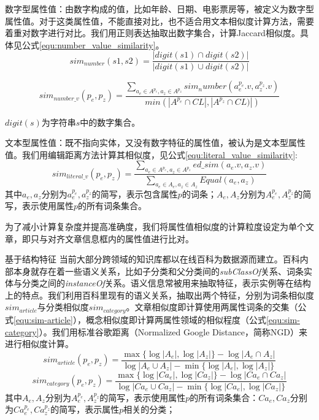 数字型属性值：由数字构成的值，比如年龄、日期、电影票房等，被定义为数字型属性值。对于这类属性值，不能直接对比，也不适合用文本相似度计算方法，需要着重对数字进行对比。我们用正则表达抽取出数字集合，计算Jaccard相似度。具体见公式\ref{equ:number_value_similarity}。
\begin{equation}
sim_{number}(s1, s2) = \frac { |digit(s1) \cap digit(s2)| }{ |digit(s1) \cup digit(s2)| }
\end{equation}

\begin{equation}
\label{equ:number_value_similarity}
sim_{number\_v}(p_e, p_z) = \frac{\sum_{a_e\in A^{p_e}, a_z \in A^{p_z}} sim_number(a_e^{p_e}.v, a_z^{p_z}.v)}{min(\left| A^{p_e}\cap CL \right|, \left|A^{p_z} \cap CL) \right|)}
\end{equation}

$digit(s)$为字符串$s$中的数字集合。

文本型属性值：既不指向实体，又没有数字特征的属性值，被认为是文本型属性值。我们用编辑距离方法计算其相似度，见公式\ref{equ:literal_value_similarity}:
\begin{equation}
\label{equ:literal_value_similarity}
sim_{literal\_v}(p_e, p_z) = \frac { \sum _{ { a }_{ e }\in { A }^{p_e },{ a }_{ z }\in { A }^{p_z } }{ ed\_sim\left( { a }_{ e }.v,{ a }_{ z }.v \right)  }  }{ \sum _{ { a }_{ e }\in { A }_{ e },{ a }_{ z }\in { A }_{ z } }{ Equal\left( { a }_{ e },{ a }_{ z } \right)  }  }
\end{equation}
其中$a_e, a_z$分别为$a_e^{p_e}, a_z^{p_z}$的简写，表示包含属性$p$的词条；$A_e, A_z$分别为$A_e^{p_e},A_z^{p_z}$的简写，表示使用属性$p$的所有词条集合。

为了减小计算复杂度并提高准确度，我们将属性值相似度的计算粒度设定为单个文章，即只与对齐文章信息框内的属性值进行比对。

{\heiti 基于结构特征}
当前大部分跨领域的知识库都以在线百科为数据源而建立。百科内部本身就存在着一些语义关系，比如子分类和父分类间的\textit{subClassOf}关系、词条实体与分类之间的\textit{instanceOf}关系。语义信息常被用来抽取特征\cite{wang2014cross}，表示实例等在结构上的特点。我们利用百科里现有的语义关系，抽取出两个特征，分别为词条相似度$sim_{article}$与分类相似度$sim_{category}$。文章相似度即计算使用两属性词条的交集（公式\ref{equ:sim-article}），概念相似度即计算两属性领域的相似程度（公式\ref{equ:sim-category}）。我们用标准谷歌距离（Normalized Google Distance，简称NGD）来进行相似度计算。
\begin{equation}
\label{equ:sim-article}
sim_{article}(p_e, p_z) = \frac{\max\{\log |A_e|, \log |A_z|\} - \log|A_e \cap A_z|}
{\log |A_e \cup A_z| - \min\{\log |A_e|, \log |A_z|\}}
\end{equation}
\begin{equation}
\label{equ:sim-category}
sim_{category}(p_e, p_z) = \frac{\max\{\log |Ca_e|, \log |Ca_z|\} - \log|Ca_e \cap Ca_z|}
{\log |Ca_e \cup Ca_z| - \min\{\log |Ca_e|, \log |Ca_z|\}}
\end{equation}
其中$A_e, A_z$分别为$A_e^{p_e},A_z^{p_z}$的简写，表示使用属性$p$的所有词条集合：$Ca_e, Ca_z$分别为$Ca_e^{p_e}, Ca_z^{p_z}$的简写，表示属性$p$相关的分类；

